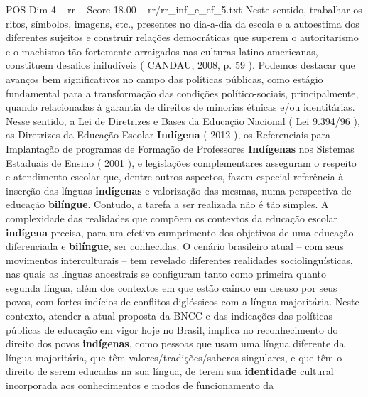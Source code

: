 \begin{textsample}{POS Dim 4 – rr – Score 18.00 – rr/rr\_inf\_e\_ef\_5.txt}
Neste sentido, trabalhar os ritos, símbolos, imagens, etc., presentes no dia-a-dia da escola e a autoestima dos diferentes sujeitos e construir relações democráticas que superem o autoritarismo e o machismo tão fortemente arraigados nas culturas latino-americanas, constituem desafios iniludíveis ( CANDAU, 2008, p. 59 ).
Podemos destacar que avanços bem significativos no campo das políticas públicas, como estágio fundamental para a transformação das condições político-sociais, principalmente, quando relacionadas à garantia de direitos de minorias étnicas e/ou identitárias.
Nesse sentido, a Lei de Diretrizes e Bases da Educação Nacional ( Lei 9.394/96 ), as Diretrizes da Educação Escolar \textbf{Indígena} ( 2012 ), os Referenciais para Implantação de programas de Formação de Professores \textbf{Indígenas} nos Sistemas Estaduais de Ensino ( 2001 ), e legislações complementares asseguram o respeito e atendimento escolar que, dentre outros aspectos, fazem especial referência à inserção das línguas \textbf{indígenas} e valorização das mesmas, numa perspectiva de educação \textbf{bilíngue}.
Contudo, a tarefa a ser realizada não é tão simples.
A complexidade das realidades que compõem os contextos da educação escolar \textbf{indígena} precisa, para um efetivo cumprimento dos objetivos de uma educação diferenciada e \textbf{bilíngue}, ser conhecidas.
O cenário brasileiro atual – com seus movimentos interculturais – tem revelado diferentes realidades sociolinguísticas, nas quais as línguas ancestrais se configuram tanto como primeira quanto segunda língua, além dos contextos em que estão caindo em desuso por seus povos, com fortes indícios de conflitos diglóssicos com a língua majoritária.
Neste contexto, atender a atual proposta da BNCC e das indicações das políticas públicas de educação em vigor hoje no Brasil, implica no reconhecimento do direito dos povos \textbf{indígenas}, como pessoas que usam uma língua diferente da língua majoritária, que têm valores/tradições/saberes singulares, e que têm o direito de serem educadas na sua língua, de terem sua \textbf{identidade} cultural incorporada aos conhecimentos e modos de funcionamento da

\end{textsample}
